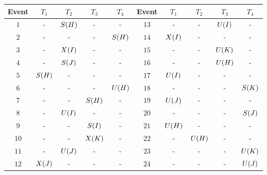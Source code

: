 \begin{tabular}{|c|c|c|c|c||c|c|c|c|c|}
  \hline
  Event & $T_1$ & $T_2$ & $T_3$ & $T_4$ &Event & $T_1$ & $T_2$ & $T_3$ & $T_4$ \\
  \hline
  $1$   & -       & $S(H)$& -       & -       &$13$  & -       & -       & $U(I)$& -       \\
  $2$   & -       & -       & -       & $S(H)$&$14$  & $X(I)$& -       & -       & -       \\
  $3$   & -       & $X(I)$& -       & -       &$15$  & -       & -       & $U(K)$& -       \\
  $4$   & -       & $S(J)$& -       & -       &$16$  & -       & -       & $U(H)$& -       \\
  $5$   & $S(H)$& -       & -       & -       &$17$  & $U(I)$& -       & -       & -       \\
  $6$   & -       & -       & -       & $U(H)$&$18$  & -       & -       & -       & $S(K)$\\
  $7$   & -       & -       & $S(H)$& -       &$19$  & $U(J)$& -       & -       & -       \\
  $8$   & -       & $U(I)$& -       & -       &$20$  & -       & -       & -       & $S(J)$\\
  $9$   & -       & -       & $S(I)$& -       &$21$  & $U(H)$& -       & -       & -       \\
  $10$  & -       & -       & $X(K)$& -       &$22$  & -       & $U(H)$& -       & -       \\
  $11$  & -       & $U(J)$& -       & -       &$23$  & -       & -       & -       & $U(K)$\\
  $12$  & $X(J)$& -       & -       & -       &$24$  & -       & -       & -       & $U(J)$\\
  \hline
\end{tabular}
\\

